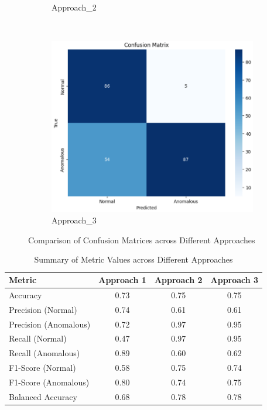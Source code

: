 \documentclass[12pt,DIV14,BCOR12mm,a4paper,footinclude=false,headinclude,parskip=half-,twoside,openright,cleardoublepage=empty,toc=index,bibliography=totoc,listof=totoc]{scrreprt}
\numberwithin{equation}{chapter}
\begin{document}
\begin{figure}
\begin{subfigure}[b]{0.55\textwidth}
        \caption{Approach\_2}
        \label{fig:confusion2}
    \end{subfigure}
    \\ %
    \begin{subfigure}[b]{0.55\textwidth} %
        \centering
        \includegraphics[width=\textwidth]{../media/approach3_confusion.PNG}
        \caption{Approach\_3}
        \label{fig:confusion3}
    \end{subfigure}
    
    \caption{Comparison of Confusion Matrices across Different Approaches}
    \label{fig:confusion_matrices}
\end{figure}

\begin{table}
    \centering
    \caption{Summary of Metric Values across Different Approaches}
    \label{tab:metrics_summary}
    \begin{tabular}{lccc} %
        \toprule
        \textbf{Metric} & \textbf{Approach 1} & \textbf{Approach 2} & \textbf{Approach 3} \\ 
        \midrule
        Accuracy & 0.73 & 0.75 & 0.75 \\ 
        Precision (Normal) & 0.74 & 0.61 & 0.61 \\ 
        Precision (Anomalous) & 0.72 & 0.97 & 0.95 \\ 
        Recall (Normal) & 0.47 & 0.97 & 0.95 \\ 
        Recall (Anomalous) & 0.89 & 0.60 & 0.62 \\ 
        F1-Score (Normal) & 0.58 & 0.75 & 0.74 \\ 
        F1-Score (Anomalous) & 0.80 & 0.74 & 0.75 \\ 
        Balanced Accuracy & 0.68 & 0.78 & 0.78 \\ 
        \bottomrule
    \end{tabular}
\end{table}
\end{document}
